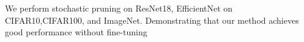 We perform stochastic pruning on ResNet18, EfficientNet on CIFAR10,CIFAR100,
and ImageNet. Demonstrating that our method achieves good performance
without fine-tuning 






%
%



